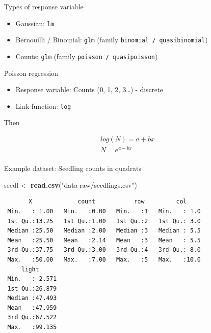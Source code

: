\documentclass[10pt,ignorenonframetext,]{beamer}
\newenvironment{Shaded}{\begin{snugshade}}{\end{snugshade}}
\newcommand{\KeywordTok}[1]{\textcolor[rgb]{0.13,0.29,0.53}{\textbf{{#1}}}}
\newcommand{\StringTok}[1]{\textcolor[rgb]{0.31,0.60,0.02}{{#1}}}
\newcommand{\NormalTok}[1]{{#1}}
\begin{document}
\begin{frame}[fragile]{Types of response variable}

\begin{itemize}[<+->]
\item
  Gaussian: \texttt{lm}
\item
  Bernouilli / Binomial: \texttt{glm} (family
  \texttt{binomial\ /\ quasibinomial})
\item
  Counts: \texttt{glm} (family \texttt{poisson\ /\ quasipoisson})
\end{itemize}

\end{frame}

\begin{frame}[fragile]{Poisson regression}

\begin{itemize}[<+->]
\item
  Response variable: Counts (0, 1, 2, 3\ldots{}) - discrete
\item
  Link function: \texttt{log}
\end{itemize}

Then

\[
  \begin{aligned} 
  log(N) = a + bx \\  
  N = e^{a+bx} \\ 
  \end{aligned} 
\]

\end{frame}

\begin{frame}[fragile]{Example dataset: Seedling counts in quadrats}

\begin{Shaded}
\begin{Highlighting}[]
\NormalTok{seedl <-}\StringTok{ }\KeywordTok{read.csv}\NormalTok{(}\StringTok{"data-raw/seedlings.csv"}\NormalTok{)}
\end{Highlighting}
\end{Shaded}

\begin{verbatim}
       X             count           row         col      
 Min.   : 1.00   Min.   :0.00   Min.   :1   Min.   : 1.0  
 1st Qu.:13.25   1st Qu.:1.00   1st Qu.:2   1st Qu.: 3.0  
 Median :25.50   Median :2.00   Median :3   Median : 5.5  
 Mean   :25.50   Mean   :2.14   Mean   :3   Mean   : 5.5  
 3rd Qu.:37.75   3rd Qu.:3.00   3rd Qu.:4   3rd Qu.: 8.0  
 Max.   :50.00   Max.   :7.00   Max.   :5   Max.   :10.0  
     light       
 Min.   : 2.571  
 1st Qu.:26.879  
 Median :47.493  
 Mean   :47.959  
 3rd Qu.:67.522  
 Max.   :99.135  
\end{verbatim}

\end{frame}
\end{document}

